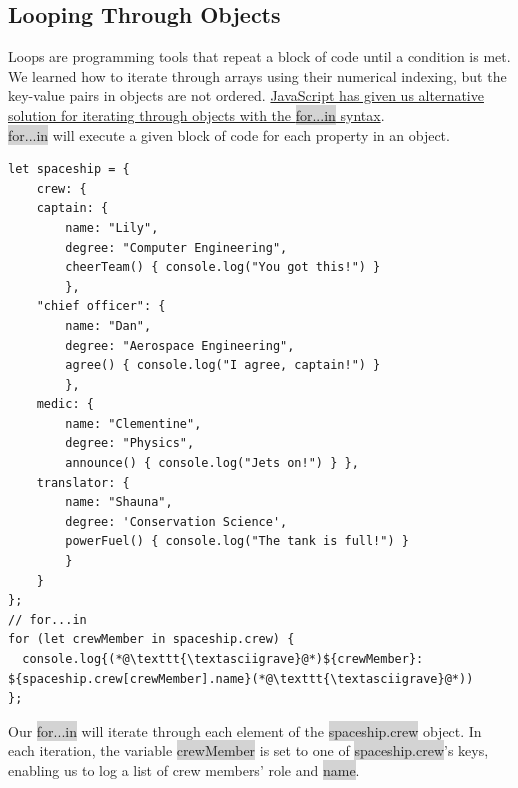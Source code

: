 \documentclass[11pt]{article}
\begin{document}
\subsection{Looping Through Objects}
Loops are programming tools that repeat a block of code until a condition is met. We learned how to iterate through arrays using their numerical indexing, but the key-value pairs in objects are not ordered. \href{https://developer.mozilla.org/en-US/docs/Web/JavaScript/Reference/Statements/for...in}{JavaScript has given us alternative solution for iterating through objects with the \colorbox{lightgray}{for...in} syntax}. \\
\newline
\colorbox{lightgray}{for...in} will execute a given block of code for each property in an object. 
\begin{lstlisting}
let spaceship = {
    crew: {
    captain: { 
        name: "Lily", 
        degree: "Computer Engineering", 
        cheerTeam() { console.log("You got this!") } 
        },
    "chief officer": { 
        name: "Dan", 
        degree: "Aerospace Engineering", 
        agree() { console.log("I agree, captain!") } 
        },
    medic: { 
        name: "Clementine", 
        degree: "Physics", 
        announce() { console.log("Jets on!") } },
    translator: {
        name: "Shauna", 
        degree: 'Conservation Science', 
        powerFuel() { console.log("The tank is full!") } 
        }
    }
}; 
// for...in
for (let crewMember in spaceship.crew) {
  console.log{(*@\texttt{\textasciigrave}@*)${crewMember}: ${spaceship.crew[crewMember].name}(*@\texttt{\textasciigrave}@*))
};
\end{lstlisting}
Our \colorbox{lightgray}{for...in} will iterate through each element of the \colorbox{lightgray}{spaceship.crew} object. In each iteration, the variable \colorbox{lightgray}{crewMember} is set to one of \colorbox{lightgray}{spaceship.crew}'s keys, enabling us to log a list of crew members’ role and \colorbox{lightgray}{name}.
\end{document}
